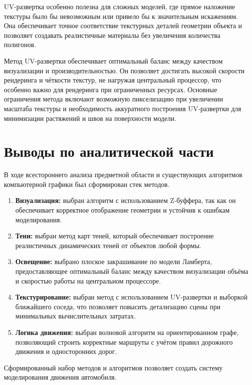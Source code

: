 UV-развертка особенно полезна для сложных моделей, где прямое наложение текстуры было бы невозможным или привело бы к значительным искажениям. Она обеспечивает точное соответствие текстурных деталей геометрии объекта и позволяет создавать реалистичные материалы без увеличения количества полигонов. 

Метод UV-развертки обеспечивает оптимальный баланс между качеством визуализации и производительностью. Он позволяет достигать высокой скорости рендеринга и чёткости текстур, не нагружая центральный процессор, что особенно важно для рендеринга при ограниченных ресурсах. Основные ограничения метода включают возможную пикселизацию при увеличении масштаба текстуры и необходимость аккуратного построения UV-развертки для минимизации растяжений и швов на поверхности модели.


\section{Выводы по аналитической части}

В ходе всестороннего анализа предметной области и существующих алгоритмов компьютерной графики был сформирован стек методов.

\begin{enumerate}
	\item \textbf{Визуализация:} выбран алгоритм с использованием Z-буффера, так как он обеспечивает корректное отображение геометрии и устойчив к ошибкам моделирования.
	\item \textbf{Тени:} выбран метод карт теней, который обеспечивает построение реалистичных динамических теней от объектов любой формы.
	\item \textbf{Освещение:} выбрано плоское закрашивание по модели Ламберта, предоставляющее оптимальный баланс между качеством визуализации объёма и скоростью работы на центральном процессоре.
	\item \textbf{Текстурирование:} выбран метод с использованием UV-развертки и выборкой ближайшего соседа, что позволяет повысить детализацию сцены при минимальных вычислительных затратах.
	\item \textbf{Логика движения:} выбран волновой алгоритм на ориентированном графе, позволяющий строить корректные маршруты с учётом правил дорожного движения и односторонних дорог.
\end{enumerate}

Сформированный набор методов и алгоритмов позволяет создать систему моделирования движения автомобиля.